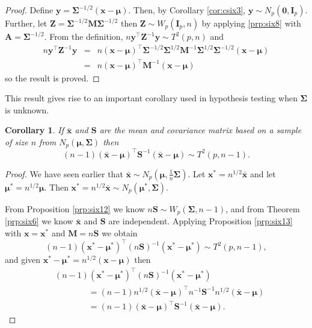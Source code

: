 \documentclass[
]{book}
\newtheorem{corollary}{Corollary}[chapter]
\theoremstyle{definition}
\theoremstyle{definition}
\theoremstyle{definition}
\theoremstyle{definition}
\theoremstyle{remark}
\begin{document}
\begin{proof}
Define \(\mathbf y= \boldsymbol{\Sigma}^{-1/2}(\mathbf x-{\boldsymbol{\mu}})\). Then, by Corollary \ref{cor:csix3}, \(\mathbf y\sim N_p({\boldsymbol 0},\mathbf I_p)\). Further, let \(\mathbf Z= \boldsymbol{\Sigma}^{-1/2} \mathbf M\boldsymbol{\Sigma}^{-1/2}\) then \(\mathbf Z\sim W_p(\mathbf I_p,n)\) by applying \ref{prp:six8} with \(\mathbf A= \boldsymbol{\Sigma}^{-1/2}\). From the definition, \(n \mathbf y^\top \mathbf Z^{-1} \mathbf y\sim T^2(p,n)\) and
\begin{eqnarray*}
n \mathbf y^\top \mathbf Z^{-1} \mathbf y&=& n (\mathbf x-{\boldsymbol{\mu}})^\top \boldsymbol{\Sigma}^{-1/2} \boldsymbol{\Sigma}^{1/2} \mathbf M^{-1} \boldsymbol{\Sigma}^{1/2} \boldsymbol{\Sigma}^{-1/2} (\mathbf x-{\boldsymbol{\mu}}) \\
&=& n(\mathbf x-{\boldsymbol{\mu}})^\top \mathbf M^{-1}(\mathbf x-{\boldsymbol{\mu}})
\end{eqnarray*}
so the result is proved.
\end{proof}

This result gives rise to an important corollary used in hypothesis testing when \(\boldsymbol{\Sigma}\) is unknown.

\begin{corollary}
\protect\hypertarget{cor:csix5}{}\label{cor:csix5}If \(\bar{\mathbf x}\) and \(\mathbf S\) are the mean and covariance matrix based on a sample of size \(n\) from \(N_p({\boldsymbol{\mu}},\boldsymbol{\Sigma})\) then
\[ (n-1)(\bar{\mathbf x}-{\boldsymbol{\mu}})^\top \mathbf S^{-1} (\bar{\mathbf x}-{\boldsymbol{\mu}}) \sim T^2(p,n-1).\]
\end{corollary}

\begin{proof}
We have seen earlier that \(\bar{\mathbf x} \sim N_p({\boldsymbol{\mu}},\frac{1}{n}\boldsymbol{\Sigma})\). Let \(\mathbf x^\ast = n^{1/2} \bar{\mathbf x}\) and let \({\boldsymbol{\mu}}^\ast = n^{1/2} {\boldsymbol{\mu}}\). Then \(\mathbf x^\ast=n^{1/2} \bar{\mathbf x} \sim N_p({\boldsymbol{\mu}}^\ast, \boldsymbol{\Sigma})\).

From Proposition \ref{prp:six12} we know \(n\mathbf S\sim W_p(\boldsymbol{\Sigma},n-1)\), and from Theorem \ref{prp:six6} we know \(\bar{\mathbf x}\) and \(\mathbf S\) are independent. Applying Proposition \ref{prp:six13} with \(\mathbf x= \mathbf x^\ast\) and \(\mathbf M= n\mathbf S\) we obtain
\[ (n-1)(\mathbf x^\ast - {\boldsymbol{\mu}}^\ast)^\top (n\mathbf S)^{-1} (\mathbf x^\ast - {\boldsymbol{\mu}}^\ast) \sim T^2(p,n-1),\]
and given \(\mathbf x^\ast - {\boldsymbol{\mu}}^\ast = n^{1/2} (\mathbf x-{\boldsymbol{\mu}})\) then
\begin{align*}
&(n-1)(\mathbf x^\ast - {\boldsymbol{\mu}}^\ast)^\top (n\mathbf S)^{-1} (\mathbf x^\ast - {\boldsymbol{\mu}}^\ast)\\
& \qquad \qquad = (n-1)n^{1/2}(\bar{\mathbf x}-{\boldsymbol{\mu}})^\top n^{-1} \mathbf S^{-1} n^{1/2}(\bar{\mathbf x}-{\boldsymbol{\mu}}) \\
&\qquad \qquad = (n-1)(\bar{\mathbf x}-{\boldsymbol{\mu}})^\top \mathbf S^{-1} (\bar{\mathbf x}-{\boldsymbol{\mu}}).
\end{align*}
\end{proof}
\end{document}
